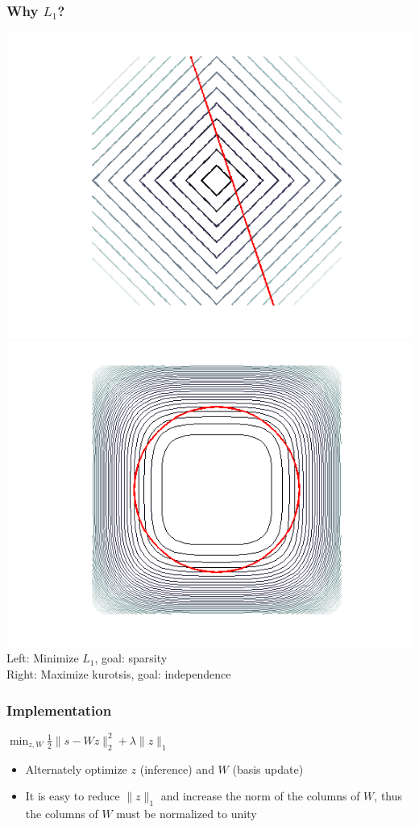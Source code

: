 \documentclass{beamer}
\begin{document}
\begin{frame}
\frametitle{Why $L_1$?}
\begin{center}
\includegraphics[scale = 0.3]{L1.png} 
\includegraphics[scale = 0.3]{ICA.png}\\
Left: Minimize $L_1$, goal: sparsity\\ Right: Maximize kurotsis, goal: independence
\end{center} 
\end{frame} 

\begin{frame} 
\frametitle{Implementation} 
\begin{center}
$\min_{z, W} \frac{1}{2} \|s - W z \|_2 ^2 + \lambda \| z \|_1$\\
\begin{itemize}
\item{Alternately optimize $z$ (inference) and $W$ (basis update)}
\item{It is easy to reduce $\|z\|_1$ and increase the norm of the columns of $W$, thus the columns of $W$ must be normalized to unity}
\end{itemize} 
\end{center} 
\end{frame} 
\end{document}
